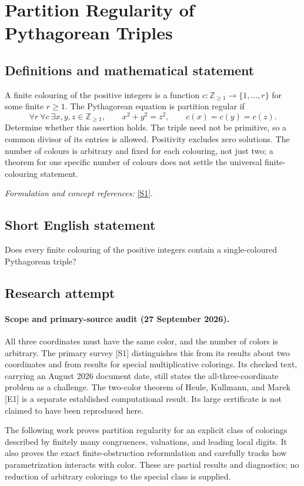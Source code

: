 \documentclass[11pt]{article}
\begin{document}
\section*{\texorpdfstring{Partition Regularity of Pythagorean Triples}{Partition Regularity of Pythagorean Triples}}\label{30003641}
\subsection{Definitions and mathematical statement}
A finite colouring of the positive integers is a function $c:{\mathbb{Z}}_{\ge1}\to\{1,\ldots,r\}$ for some finite $r\ge1$. The Pythagorean equation is partition regular if
\[
 \forall r\ \forall c\ \exists x,y,z\in{\mathbb{Z}}_{\ge1},
 \qquad x^2+y^2=z^2,
 \qquad c(x)=c(y)=c(z).
\]
Determine whether this assertion holds. The triple need not be primitive, so a common divisor of its entries is allowed. Positivity excludes zero solutions. The number of colours is arbitrary and fixed for each colouring, not just two; a theorem for one specific number of colours does not settle the universal finite-colouring statement.
\par\smallskip\textit{Formulation and concept references:} \href{https://arxiv.org/abs/2411.17523}{[S1]}.

\subsection{Short English statement}
Does every finite colouring of the positive integers contain a single-coloured Pythagorean triple?
\subsection{Research attempt}
\paragraph{Scope and primary-source audit (27 September 2026).}
All three coordinates must have the same color, and the number of colors is arbitrary. The primary survey [S1] distinguishes this from its results about two coordinates and from results for special multiplicative colorings. Its checked text, carrying an August 2026 document date, still states the all-three-coordinate problem as a challenge. The two-color theorem of Heule, Kullmann, and Marek [E1] is a separate established computational result. Its large certificate is not claimed to have been reproduced here.

The following work proves partition regularity for an explicit class of colorings described by finitely many congruences, valuations, and leading local digits. It also proves the exact finite-obstruction reformulation and carefully tracks how parametrization interacts with color. These are partial results and diagnostics; no reduction of arbitrary colorings to the special class is supplied.
\end{document}
